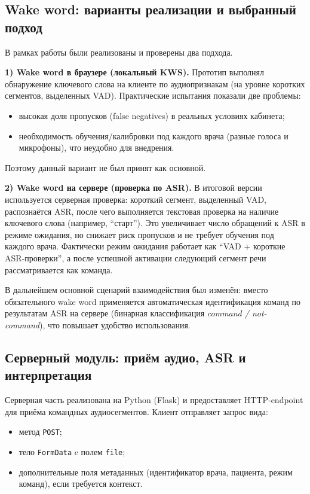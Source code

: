 \subsection{Wake word: варианты реализации и выбранный подход}
\label{subsec:wakeword}

В рамках работы были реализованы и проверены два подхода.

\textbf{1) Wake word в браузере (локальный KWS).}
Прототип выполнял обнаружение ключевого слова на клиенте по аудиопризнакам (на уровне коротких сегментов, выделенных VAD).
Практические испытания показали две проблемы:
\begin{itemize}
    \item высокая доля пропусков (false negatives) в реальных условиях кабинета;
    \item необходимость обучения/калибровки под каждого врача (разные голоса и микрофоны), что неудобно для внедрения.
\end{itemize}
Поэтому данный вариант не был принят как основной.

\textbf{2) Wake word на сервере (проверка по ASR).}
В итоговой версии используется серверная проверка: короткий сегмент, выделенный VAD, распознаётся ASR, после чего выполняется текстовая проверка на наличие ключевого слова (например, \enquote{старт}).
Это увеличивает число обращений к ASR в режиме ожидания, но снижает риск пропусков и не требует обучения под каждого врача.
Фактически режим ожидания работает как \enquote{VAD + короткие ASR‑проверки}, а после успешной активации следующий сегмент речи рассматривается как команда.



В дальнейшем основной сценарий взаимодействия был изменён: вместо обязательного wake word применяется автоматическая идентификация команд по результатам ASR на сервере (бинарная классификация \textit{command / not-command}), что повышает удобство использования.
\subsection{Серверный модуль: приём аудио, ASR и интерпретация}
\label{subsec:task3}

Серверная часть реализована на Python (Flask) и предоставляет HTTP‑endpoint для приёма командных аудиосегментов.
Клиент отправляет запрос вида:
\begin{itemize}
    \item метод \texttt{POST};
    \item тело \texttt{FormData} c полем \texttt{file};
    \item дополнительные поля метаданных (идентификатор врача, пациента, режим команд), если требуется контекст.
\end{itemize}


